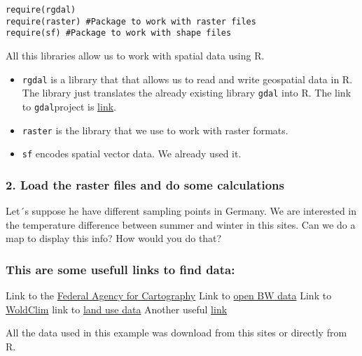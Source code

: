 \documentclass[
]{book}
\theoremstyle{definition}
\theoremstyle{definition}
\theoremstyle{definition}
\theoremstyle{definition}
\theoremstyle{remark}
\begin{document}
\begin{verbatim}
require(rgdal)
require(raster) #Package to work with raster files
require(sf) #Package to work with shape files
\end{verbatim}

All this libraries allow us to work with spatial data using R.

\begin{itemize}
\item
  \texttt{rgdal} is a library that that allows us to read and write geospatial data in R. The library just translates the already existing library \texttt{gdal} into R. The link to \texttt{gdal}project is \href{https://gdal.org/}{link}.
\item
  \texttt{raster} is the library that we use to work with raster formats.
\item
  \texttt{sf} encodes spatial vector data. We already used it.
\end{itemize}

\hypertarget{load-the-raster-files-and-do-some-calculations}{%
\subsubsection{2. Load the raster files and do some calculations}\label{load-the-raster-files-and-do-some-calculations}}

Let´s suppose he have different sampling points in Germany. We are interested in the temperature difference between summer and winter in this sites. Can we do a map to display this info? How would you do that?

\hypertarget{this-are-some-usefull-links-to-find-data}{%
\subsubsection{This are some usefull links to find data:}\label{this-are-some-usefull-links-to-find-data}}

Link to the \href{https://www.bkg.bund.de/DE/Home/home.html}{Federal Agency for Cartography}
Link to \href{https://www.lgl-bw.de/lgl-internet/opencms/de/07_Produkte_und_Dienstleistungen/Open_Data_Initiative/}{open BW data}
Link to \href{http://worldclim.org/version2}{WoldClim}
link to \href{https://land.copernicus.eu/pan-european/corine-land-cover}{land use data}
Another useful \href{https://www.eea.europa.eu}{link}

All the data used in this example was download from this sites or directly from R.
\end{document}
